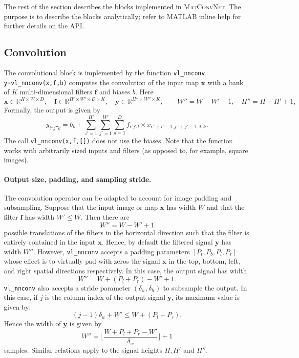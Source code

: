 \documentclass[12pt]{article}
\newcommand{\real}{\mathbb{R}}
\newcommand{\vlnn}{\textsc{MatConvNet}\xspace}
\newcommand{\bx}{\mathbf{x}}
\newcommand{\by}{\mathbf{y}}
\newcommand{\bff}{\mathbf{f}}
\begin{document}
The rest of the section describes the blocks implemented in \vlnn. The purpose is to describe the blocks analytically; refer to MATLAB inline help for further details on the API.

\subsection{Convolution}\label{s:convolution}

The convolutional block is implemented by the function \verb!vl_nnconv!. \verb!y=vl_nnconv(x,f,b)! computes the convolution of the input map $\bx$ with a bank of $K$ multi-dimensional filters $\bff$ and biases $b$. Here
\[
 \bx\in\real^{H \times W \times D}, \quad
 \bff\in\real^{H' \times W' \times D \times K}, \quad
 \by\in\real^{H'' \times W'' \times K}, \quad
 \quad
 W'' = W - W' + 1,
 \quad
 H'' = H - H' + 1,
\]
Formally, the output  is given by
\[
y_{i''j''k}
=
b_k
+
\sum_{i'=1}^{H'}
\sum_{j'=1}^{W'}
\sum_{d=1}^D
f_{i'j'd} \times x_{i''+i'-1,j''+j'-1,d,k}.
\]
The call \verb!vl_nnconv(x,f,[])! does not use the biases. Note that the function works with arbitrarily sized inputs and filters (as opposed to, for example, square images).

\paragraph{Output size, padding, and sampling stride.} The convolution operator can be adapted to account for image padding and subsampling. Suppose that the input image or map $\bx$ has width $W$ and that the filter $\bff$ has width $W' \leq W$. Then there are 
\[
  W'' = W - W' + 1
\]
possible translations of the filters in the horizontal direction such that the filter is entirely contained in the input $\bx$. Hence, by default the filtered signal $\by$ has width $W''$. However, \verb!vl_nnconv! accepts a padding parameters $[P_t,P_b,P_l,P_r]$ whose effect is to virtually pad with zeros the signal $\bx$ in the top, bottom, left, and right  spatial directions respectively. In this case, the output signal has width
\[
  W'' = W + (P_l + P_r) - W' + 1.
\]
\verb!vl_nnconv! also accepts a stride parameter $(\delta_w,\delta_h)$ to subsample the output. In this case, if $j$ is the column index of the output signal $\by$, its maximum value is given by:
\[
(j-1)\delta_w + W' \leq W + (P_l+P_r).
\]
Hence the width of $\by$ is given by
\[
W'' = \lfloor
\frac{W + P_l+P_r - W'}{\delta_w}
\rfloor + 1
\]
samples. Similar relations apply to the signal heights $H,H'$ and $H''$.
\end{document}

